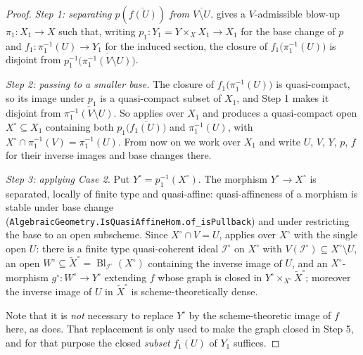 \begin{proof}
  \leanok
  \emph{Step 1: separating $p(\overline{f(U)})$ from $\overline{V\setminus U}$.}
   gives a $V$-admissible
  blow-up $\pi_1\colon X_1\to X$ such that, writing
  $p_1\colon Y_1=Y\times_XX_1\to X_1$ for the base change of $p$ and
  $f_1\colon\pi_1^{-1}(U)\to Y_1$ for the induced section, the closure of
  $f_1\bigl(\pi_1^{-1}(U)\bigr)$ is disjoint from
  $p_1^{-1}\bigl(\overline{\pi_1^{-1}(V\setminus U)}\bigr)$.

  \emph{Step 2: passing to a smaller base.}  The closure of
  $f_1\bigl(\pi_1^{-1}(U)\bigr)$ is quasi-compact, so its image under $p_1$ is a
  quasi-compact subset of $X_1$, and Step 1 makes it disjoint from
  $\overline{\pi_1^{-1}(V\setminus U)}$.  So
   applies over $X_1$ and produces a
  quasi-compact open $X^{\circ}\subseteq X_1$ containing both
  $p_1\bigl(\overline{f_1(U)}\bigr)$ and $\pi_1^{-1}(U)$, with
  $X^{\circ}\cap\pi_1^{-1}(V)=\pi_1^{-1}(U)$.  From now on we work over $X_1$
  and write $U$, $V$, $Y$, $p$, $f$ for their inverse images and base changes
  there.

  \emph{Step 3: applying Case 2.}  Put $Y^{\circ}=p_1^{-1}(X^{\circ})$.  The
  morphism $Y^{\circ}\to X^{\circ}$ is separated, locally of finite type and
  quasi-affine: quasi-affineness of a morphism is stable under base change
  (\texttt{AlgebraicGeometry.IsQuasiAffineHom.of\_isPullback}) and under
  restricting the base to an open subscheme.  Since $X^{\circ}\cap V=U$,
   applies over $X^{\circ}$
  with the single open $U$: there is a finite type quasi-coherent ideal
  $\mathcal I^{\circ}$ on $X^{\circ}$ with
  $V(\mathcal I^{\circ})\subseteq X^{\circ}\setminus U$, an open
  $W^{\circ}\subseteq\widetilde X^{\circ}=
  \operatorname{Bl}_{\mathcal I^{\circ}}(X^{\circ})$ containing the inverse
  image of $U$, and an $X^{\circ}$-morphism $g^{\circ}\colon W^{\circ}\to
  Y^{\circ}$ extending $f$ whose graph is closed in
  $Y^{\circ}\times_{X^{\circ}}\widetilde X^{\circ}$; moreover the inverse image
  of $U$ in $\widetilde X^{\circ}$ is scheme-theoretically dense.

  Note that it is \emph{not} necessary to replace $Y^{\circ}$ by the
  scheme-theoretic image of $f$ here, as \cite{ConradNagata} does.  That
  replacement is only used to make the graph closed in Step 5, and for that
  purpose the closed \emph{subset} $\overline{f_1(U)}$ of $Y_1$ suffices.


\end{proof}
